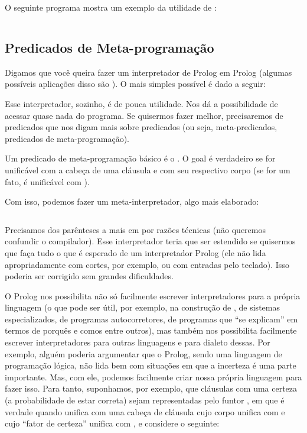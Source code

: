 \documentclass{article}
\begin{document}
O seguinte programa mostra um exemplo da utilidade de :

\inputminted{prolog}{../Exemplos/Cap6/prog3_apply.pl}

\subsection{Predicados de Meta-programação}

Digamos que você queira fazer um interpretador de Prolog em Prolog (algumas possíveis aplicações disso são ). O mais simples possível é dado a seguir:


Esse interpretador, sozinho, é de pouca utilidade. Nos dá a possibilidade de acessar quase nada do programa. Se quisermos fazer
melhor, precisaremos de predicados que nos digam mais sobre predicados (ou seja, meta-predicados, predicados de meta-programação).

Um predicado de meta-programação básico é o . O goal  é verdadeiro se  for unificável
com a cabeça de uma cláusula e  com seu respectivo corpo (se  for um fato,  é unificável com ).

Com isso, podemos fazer um meta-interpretador, algo mais elaborado:

\inputminted{prolog}{../Exemplos/Cap6/prog4_meta1.pl}

Precisamos dos parênteses a mais em  por razões técnicas (não queremos confundir o compilador). Esse
interpretador teria que ser estendido se quisermos que faça tudo o que é esperado de um interpretador Prolog (ele não lida
apropriadamente com cortes, por exemplo, ou com entradas pelo teclado). Isso poderia ser corrigido sem grandes dificuldades.

O Prolog nos possibilita não só facilmente escrever interpretadores para a própria linguagem (o que pode ser útil, por exemplo, na construção de , de sistemas especializados, de programas autocorretores, de programas que ``se explicam'' em termos
de porquês e comos entre outros), mas também nos possibilita facilmente escrever interpretadores para outras linguagens e para
dialeto dessas. Por exemplo, alguém poderia argumentar que o Prolog, sendo uma linguagem de programação lógica, não lida bem
com situações em que a incerteza é uma parte importante. Mas, com ele, podemos facilmente criar nossa própria linguagem
para fazer isso. Para tanto, suponhamos, por exemplo, que cláusulas com uma certeza (a probabilidade
de estar correta)  sejam representadas pelo funtor , em que  é verdade quando  unifica com uma cabeça de cláusula cujo corpo unifica com  e cujo ``fator de certeza''  unifica com , e considere o seguinte:
\end{document}
